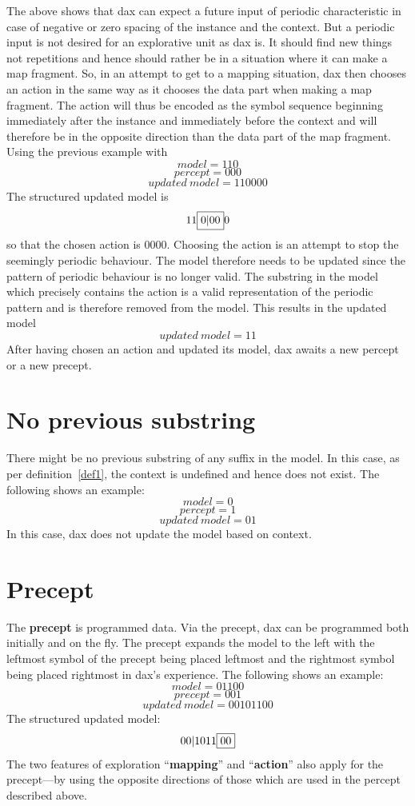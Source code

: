 The above shows that dax can expect a future input of periodic
characteristic in case of negative or zero spacing of the instance and
the context. But a periodic input is not desired for an explorative unit
as dax is. It should find new things not repetitions and hence should
rather be in a situation where it can make a map fragment.
So, in an attempt to get to a mapping situation, dax
then chooses an action in the same way as it chooses the data part
when making a map fragment. The action will thus be encoded as the
symbol sequence beginning immediately after the instance and immediately
before the context and will therefore be in the opposite direction than
the data part of the map fragment. Using the previous example with
$$
model = 110
$$
$$
percept = 000
$$
$$
updated\ model = 110000
$$
The structured updated model is
$$
11\framebox{$0|00$}0
$$
so that the chosen action is $0000$. Choosing the action is an attempt
to stop the seemingly periodic behaviour. The model therefore needs
to be updated since the pattern of periodic behaviour is no longer
valid. The substring in the model which precisely contains the action is
a valid representation of the periodic pattern and is therefore removed
from the model. This results in the updated model
$$
updated\ model = 11
$$
After having chosen an action and updated its model, dax awaits a
new percept or a new precept.

\section{No previous substring}
There might be no previous substring of any suffix in the model.
In this case, as per definition~\ref{def1}, the context is undefined
and hence does not exist. The following shows an example:
$$
model = 0
$$
$$
percept = 1
$$
$$
updated\ model = 01
$$
\hfill\break
In this case, dax does not update the model based on context.

\section{Precept}
The {\bf precept} is programmed data. Via the precept, dax can
be programmed both initially and on the fly. The precept expands
the model to the left with the leftmost symbol of the precept
being placed leftmost and the rightmost symbol being placed rightmost in
dax's experience. The following shows an example:
$$
model = 01100
$$
$$
precept = 001
$$
$$
updated\ model = 00101100
$$
The structured updated model:
\hfill\break
$$
00|1011\framebox{$00$}
$$
\hfill\break
The two features of exploration ``{\bf mapping}'' and ``{\bf action}'' also
apply for the precept---by using the opposite directions of those which are used
in the percept described above.

